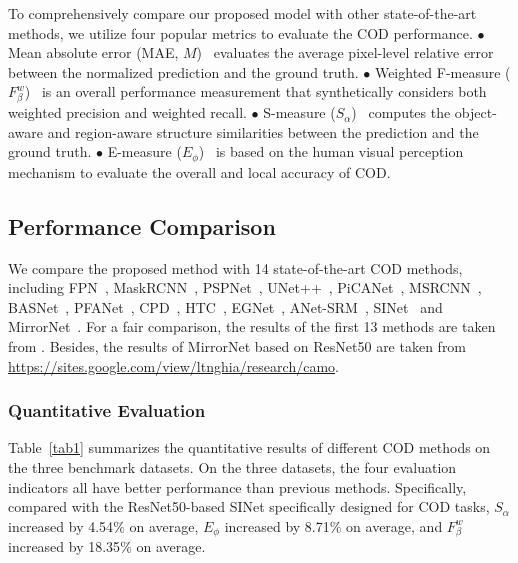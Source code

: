 \documentclass{article}
\begin{document}
To comprehensively compare our proposed model with other state-of-the-art methods, we utilize four popular metrics to evaluate the COD performance. $\bullet$ Mean absolute error (MAE, $M$)~\cite{mae} evaluates the average pixel-level relative error between the normalized prediction and the ground truth. $\bullet$ Weighted F-measure ($F_\beta^w$)~\cite{fm} is an overall performance measurement that synthetically considers both weighted precision and weighted recall. $\bullet$ S-measure ($S_\alpha$)~\cite{sm} computes the object-aware and region-aware structure similarities between the prediction and the ground truth. $\bullet$ E-measure ($E_\phi$)~\cite{21Fan_HybridLoss} is based on the human visual perception mechanism to evaluate the overall and local accuracy of COD.

\subsection{Performance Comparison}
We compare the proposed method with 14 state-of-the-art COD methods, including FPN~\cite{fpn}, MaskRCNN~\cite{maskrcnn}, PSPNet~\cite{pspnet}, UNet++~\cite{unet++}, PiCANet~\cite{picanet}, MSRCNN~\cite{masksrcnn}, BASNet~\cite{basnet}, PFANet~\cite{pfanet}, CPD~\cite{cpd}, HTC~\cite{htc}, EGNet~\cite{egnet}, ANet-SRM~\cite{anet}, SINet~\cite{fan2021concealed} and MirrorNet~\cite{mirrornet}. 
For a fair comparison, the results of the first 13 methods are taken from \cite{fan2021concealed}. Besides, the results of MirrorNet based on ResNet50 are taken from \href{https://sites.google.com/view/ltnghia/research/camo}{https://sites.google.com/view/ltnghia/research/camo}.

\subsubsection{Quantitative Evaluation}

Table~\ref{tab1} summarizes the quantitative results of different COD methods on the three benchmark datasets. On the three datasets, the four evaluation indicators all have better performance than previous methods. Specifically, compared with the ResNet50-based SINet specifically designed for COD tasks, $S_\alpha$ increased by 4.54$\%$ on average, $E_\phi$ increased by 8.71$\%$ on average, and $F_\beta^w$ increased by 18.35$\%$ on average. 
\end{document}
